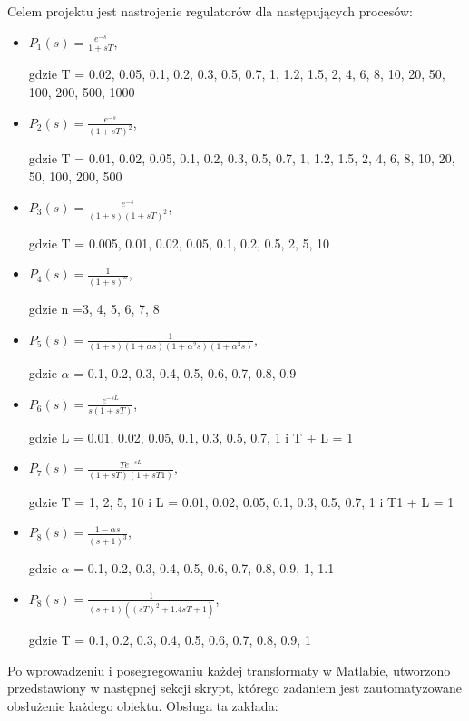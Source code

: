 Celem projektu jest nastrojenie regulatorów dla następujących procesów:
 \begin{itemize}

	 \item $ P_{1}(s) = \frac{e^{-s}}{1 +sT}	$,
	
	gdzie T = 0.02, 0.05, 0.1, 0.2, 0.3, 0.5, 0.7, 1, 1.2, 1.5, 2, 4, 6, 8, 10, 20, 50, 100, 200, 500, 1000

	\item $ P_{2}(s) = \frac{e^{-s}}{(1 +sT)^2} $,
	
	gdzie T = 0.01, 0.02, 0.05, 0.1, 0.2, 0.3, 0.5, 0.7, 1, 1.2, 1.5, 2, 4, 6, 8, 10, 20, 50, 100, 200, 500
	
	\item $ P_{3}(s) = \frac{e^{-s}}{(1 +s)(1 +sT)^2}	$,
	
	gdzie T = 0.005, 0.01, 0.02, 0.05, 0.1, 0.2,  0.5,  2, 5, 10
	
	\item $ P_{4}(s) = \frac{1}{(1 +s)^n}	$,
	
	gdzie n =3, 4, 5, 6, 7, 8
	
	\item $ P_{5}(s) = \frac{1}{(1 +s)(1 +\alpha s)(1 +\alpha^2 s)(1 +\alpha^3s)}	$,
	
	gdzie \(\alpha \) = 0.1, 0.2, 0.3, 0.4, 0.5, 0.6, 0.7, 0.8, 0.9
	
	\item $ P_{6}(s) = \frac{e^{-sL}}{s(1 +sT)} $,
	
	gdzie L = 0.01, 0.02, 0.05, 0.1, 0.3, 0.5, 0.7, 1 i 
	T + L = 1
	
	\item $ P_{7}(s) = \frac{Te^{-sL}}{(1 +sT)(1 +sT1)} $,
	
	gdzie T = 1, 2, 5, 10 i 
	L = 0.01, 0.02, 0.05, 0.1, 0.3, 0.5, 0.7, 1 i 
	T1 + L = 1
	
	\item $ P_{8}(s) = \frac{1 - \alpha s}{(s+1)^3} $,
	
	gdzie \(\alpha \) = 0.1, 0.2, 0.3, 0.4, 0.5, 0.6, 0.7, 0.8, 0.9, 1, 1.1
	
	\item $ P_{8}(s) = \frac{1}{(s+1)((sT)^2 + 1.4sT + 1)}	$,
	
	gdzie T = 0.1, 0.2, 0.3, 0.4, 0.5, 0.6, 0.7, 0.8, 0.9, 1
 	
 \end{itemize}
Po wprowadzeniu i posegregowaniu każdej transformaty w Matlabie, utworzono przedstawiony w następnej sekcji skrypt, którego zadaniem jest zautomatyzowane obsłużenie każdego obiektu. Obsługa ta zakłada:

